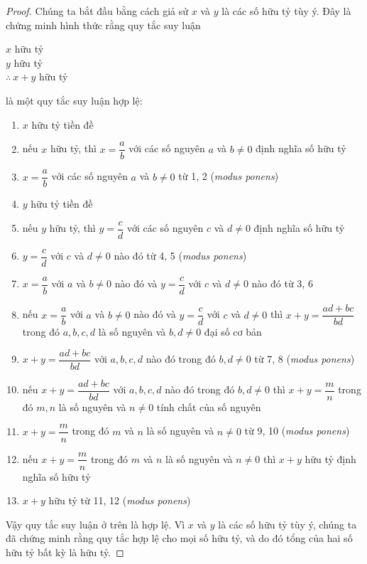\begin{proof}
Chúng ta bắt đầu bằng cách giả sử $x$ và $y$ là các số hữu tỷ tùy ý. Đây là chứng minh hình thức rằng quy tắc suy luận
\begin{center}
$x$ hữu tỷ\\
$y$ hữu tỷ\\
$\therefore\ x + y$ hữu tỷ
\end{center}
là một quy tắc suy luận hợp lệ:
\begin{enumerate}
\item $x$ hữu tỷ \hfill tiền đề
\item nếu $x$ hữu tỷ, thì $x = \dfrac{a}{b}$ với các số nguyên $a$ và $b \neq 0$ \hfill định nghĩa số hữu tỷ
\item $x = \dfrac{a}{b}$ với các số nguyên $a$ và $b \neq 0$ \hfill từ 1, 2 (\emph{modus ponens})
\item $y$ hữu tỷ \hfill tiền đề
\item nếu $y$ hữu tỷ, thì $y = \dfrac{c}{d}$ với các số nguyên $c$ và $d \neq 0$ \hfill định nghĩa số hữu tỷ
\item $y = \dfrac{c}{d}$ với $c$ và $d \neq 0$ nào đó \hfill từ 4, 5 (\emph{modus ponens})
\item $x = \dfrac{a}{b}$ với $a$ và $b \neq 0$ nào đó và $y = \dfrac{c}{d}$ với $c$ và $d \neq 0$ nào đó \hfill từ 3, 6
\item nếu $x = \dfrac{a}{b}$ với $a$ và $b \neq 0$ nào đó và $y = \dfrac{c}{d}$ với $c$ và $d \neq 0$ thì $x + y = \dfrac{ad + bc}{bd}$ trong đó $a, b, c, d$ là số nguyên và $b, d \neq 0$ \hfill đại số cơ bản
\item $x + y = \dfrac{ad + bc}{bd}$ với $a, b, c, d$ nào đó trong đó $b, d \neq 0$ \hfill từ 7, 8 (\emph{modus ponens})
\item nếu $x + y = \dfrac{ad + bc}{bd}$ với $a, b, c, d$ nào đó trong đó $b, d \neq 0$ thì $x + y = \dfrac{m}{n}$ trong đó $m, n$ là số nguyên và $n \neq 0$ \hfill tính chất của số nguyên
\item $x + y = \dfrac{m}{n}$ trong đó $m$ và $n$ là số nguyên và $n \neq 0$ \hfill từ 9, 10 (\emph{modus ponens})
\item nếu $x + y = \dfrac{m}{n}$ trong đó $m$ và $n$ là số nguyên và $n \neq 0$ thì $x + y$ hữu tỷ \hfill định nghĩa số hữu tỷ
\item $x + y$ hữu tỷ \hfill từ 11, 12 (\emph{modus ponens})
\end{enumerate}

Vậy quy tắc suy luận ở trên là hợp lệ. Vì $x$ và $y$ là các số hữu tỷ tùy ý, chúng ta đã chứng minh rằng quy tắc hợp lệ cho mọi số hữu tỷ, và do đó tổng của hai số hữu tỷ bất kỳ là hữu tỷ.
\end{proof}

